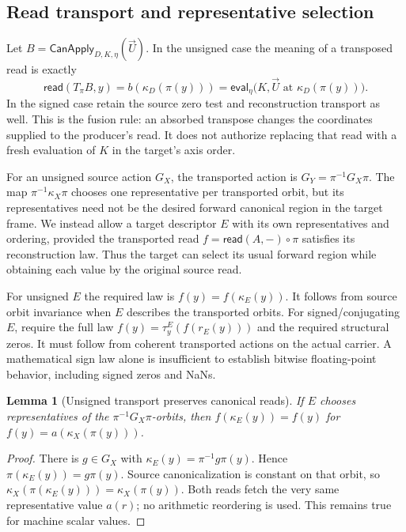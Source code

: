 \documentclass[11pt]{article}
\newtheorem{lemma}[theorem]{Lemma}
\newcommand{\Can}{\mathsf{CanApply}}
\newcommand{\rd}{\mathsf{read}}
\begin{document}
\subsection{Read transport and representative selection}
Let $B=\Can_{D,K,\eta}(\vec U)$. In the unsigned case the meaning of a transposed read is exactly
\[
 \rd(T_\pi B,y)
  =b(\kappa_D(\pi(y)))
  =\mathsf{eval}_{\eta}\bigl(K,\vec U\text{ at }\kappa_D(\pi(y))\bigr).
\]
In the signed case retain the source zero test and reconstruction transport as well. This is the fusion rule: an absorbed transpose changes the coordinates supplied to the producer's read. It does not authorize replacing that read with a fresh evaluation of $K$ in the target's axis order.

For an unsigned source action $G_X$, the transported action is
$G_Y=\pi^{-1}G_X\pi$. The map
$\pi^{-1}\kappa_X\pi$ chooses one representative per transported orbit, but its representatives need not be the desired forward canonical region in the target frame. We instead allow a target descriptor $E$ with its own representatives and ordering, provided the transported read $f=\rd(A,-)\circ\pi$ satisfies its reconstruction law. Thus the target can select its usual forward region while obtaining each value by the original source read.

For unsigned $E$ the required law is $f(y)=f(\kappa_E(y))$. It follows from source orbit invariance when $E$ describes the transported orbits. For signed/conjugating $E$, require the full law
$f(y)=\tau^E_y(f(r_E(y)))$ and the required structural zeros. It must follow from coherent transported actions on the actual carrier. A mathematical sign law alone is insufficient to establish bitwise floating-point behavior, including signed zeros and NaNs.

\begin{lemma}[Unsigned transport preserves canonical reads]
If $E$ chooses representatives of the $\pi^{-1}G_X\pi$-orbits, then
$f(\kappa_E(y))=f(y)$ for $f(y)=a(\kappa_X(\pi(y)))$.
\end{lemma}
\begin{proof}
There is $g\in G_X$ with $\kappa_E(y)=\pi^{-1}g\pi(y)$. Hence
$\pi(\kappa_E(y))=g\pi(y)$. Source canonicalization is constant on that orbit, so
$\kappa_X(\pi(\kappa_E(y)))=\kappa_X(\pi(y))$.
Both reads fetch the very same representative value $a(r)$; no arithmetic reordering is used. This remains true for machine scalar values.
\end{proof}
\end{document}
